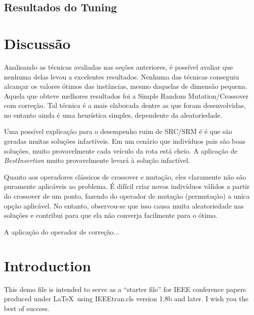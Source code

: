 \documentclass[conference]{IEEEtran}
\begin{document}
\subsection{Resultados do Tuning}


\section{Discussão}
Analisando as técnicas avaliadas nas seções anteriores, é possível avaliar que nenhuma delas levou a excelentes resultados. Nenhuma das técnicas conseguiu alcançar os valores ótimos das instâncias, mesmo daquelas de dimensão pequena.
Aquela que obteve melhores resultados foi a Simple Random Mutation/Crossover com correção. Tal técnica é a mais elaborada dentre as que foram desenvolvidas, no entanto ainda é uma heurística simples, dependente da aleatoriedade. 

Uma possível explicação para o desempenho ruim de SRC/SRM é é que são geradas muitas soluções infactíveis. Em um cenário que indivíduos pais são boas soluções, muito provavelmente cada veículo da rota está cheio. A aplicação de \textit{BestInsertion} muito provavelmente levará à solução infactível. 

Quanto aos operadores clássicos de crossover e mutação, eles claramente não são puramente aplicáveis ao problema. É difícil criar novos indivíduos válidos a partir do crossover de um ponto, fazendo do operador de mutação (permutação) a unica opção aplicável. No entanto, observou-se que isso causa muita aleatoriedade nas soluções e contribui para que ela não converja facilmente para o ótimo.

A aplicação do operador de correção...

%
\IEEEpeerreviewmaketitle



\section{Introduction}
This demo file is intended to serve as a ``starter file''
for IEEE conference papers produced under \LaTeX\ using
IEEEtran.cls version 1.8b and later.
I wish you the best of success.
\end{document}

